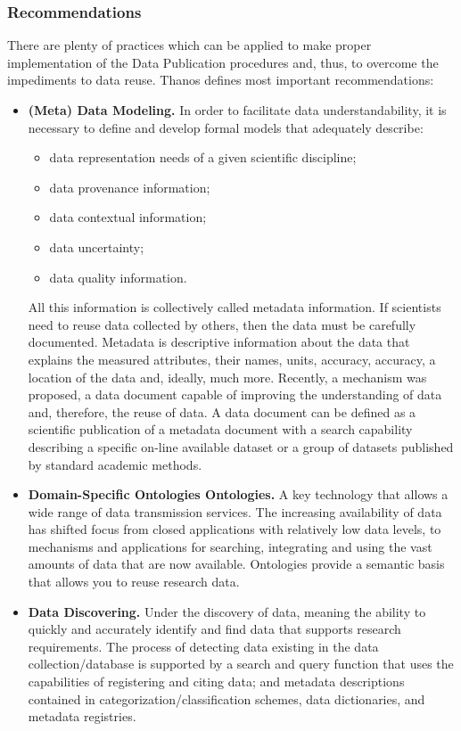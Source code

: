 \documentclass{vldb}
\begin{document}
\subsubsection{Recommendations}
There are plenty of practices which can be applied to make proper implementation of the Data Publication procedures and, thus, to overcome the impediments to data reuse. Thanos\cite{DBLP:journals/publications/Thanos17} defines most important recommendations:
\begin{itemize}
    \item \textbf{(Meta) Data Modeling.} In order to facilitate data understandability, it is necessary to define and develop formal models that adequately describe:
    \begin{itemize}
        \item data representation needs of a given scientific discipline;
        \item data provenance information;
        \item data contextual information;
        \item data uncertainty;
        \item data quality information.
    \end{itemize}
    All this information is collectively called metadata information. If scientists need to reuse data collected by others, then the data must be carefully documented. Metadata is descriptive information about the data that explains the measured attributes, their names, units, accuracy, accuracy, a location of the data and, ideally, much more. Recently, a mechanism was proposed, a data document capable of improving the understanding of data and, therefore, the reuse of data. A data document can be defined as a scientific publication of a metadata document with a search capability describing a specific on-line available dataset or a group of datasets published by standard academic methods\cite{Chavan2011}.
    \item \textbf{Domain-Specific Ontologies Ontologies.} A key technology that allows a wide range of data transmission services\cite{DBLP:journals/tods/BienvenuCLW14}. The increasing availability of data has shifted focus from closed applications with relatively low data levels, to mechanisms and applications for searching, integrating and using the vast amounts of data that are now available. Ontologies provide a semantic basis that allows you to reuse research data\cite{Gruber:1995:TPD:219666.219701}\cite{DBLP:journals/jods/PoggiLCGLR08}.
    \item \textbf{Data Discovering.} Under the discovery of data, meaning the ability to quickly and accurately identify and find data that supports research requirements. The process of detecting data existing in the data collection/database is supported by a search and query function that uses the capabilities of registering and citing data; and metadata descriptions contained in categorization/classification schemes, data dictionaries, and metadata registries.

\end{itemize}
\end{document}
